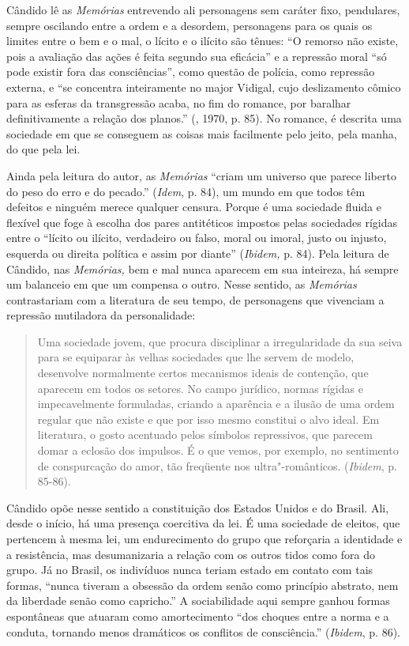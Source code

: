 Cândido lê as \emph{Memórias} entrevendo ali personagens sem caráter
fixo, pendulares, sempre oscilando entre a ordem e a desordem,
personagens para os quais os limites entre o bem e o mal, o lícito e o
ilícito são tênues: ``O remorso não existe, pois a avaliação das ações é
feita segundo sua eficácia'' e a repressão moral ``só pode existir fora
das consciências'', como questão de polícia, como repressão externa, e
``se concentra inteiramente no major Vidigal, cujo deslizamento cômico
para as esferas da transgressão acaba, no fim do romance, por baralhar
definitivamente a relação dos planos.'' (, 1970, p. 85). No
romance, é descrita uma sociedade em que se conseguem as coisas mais
facilmente pelo jeito, pela manha, do que pela lei.

Ainda pela leitura do autor, as \emph{Memórias} ``criam um universo que
parece liberto do peso do erro e do pecado.'' (\emph{Idem}, p. 84), um
mundo em que todos têm defeitos e ninguém merece qualquer censura.
Porque é uma sociedade fluida e flexível que foge à escolha dos pares
antitéticos impostos pelas sociedades rígidas entre o ``lícito ou
ilícito, verdadeiro ou falso, moral ou imoral, justo ou injusto,
esquerda ou direita política e assim por diante'' (\emph{Ibidem,} p.
84). Pela leitura de Cândido, nas \emph{Memórias,} bem e mal nunca
aparecem em sua inteireza, há sempre um balanceio em que um compensa o
outro. Nesse sentido, as \emph{Memórias} contrastariam com a literatura
de seu tempo, de personagens que vivenciam a repressão mutiladora da
personalidade:

\begin{quote}
Uma sociedade jovem, que procura disciplinar a irregularidade da sua
seiva para se equiparar às velhas sociedades que lhe servem de modelo,
desenvolve normalmente certos mecanismos ideais de contenção, que
aparecem em todos os setores. No campo jurídico, normas rígidas e
impecavelmente formuladas, criando a aparência e a ilusão de uma ordem
regular que não existe e que por isso mesmo constitui o alvo ideal. Em
literatura, o gosto acentuado pelos símbolos repressivos, que parecem
domar a eclosão dos impulsos. É o que vemos, por exemplo, no sentimento
de conspurcação do amor, tão freqüente nos ultra"-românticos.
(\emph{Ibidem}, p. 85-86).
\end{quote}

Cândido opõe nesse sentido a constituição dos Estados Unidos e do
Brasil. Ali, desde o início, há uma presença coercitiva da lei. É uma
sociedade de eleitos, que pertencem à mesma lei, um endurecimento do
grupo que reforçaria a identidade e a resistência, mas desumanizaria a
relação com os outros tidos como fora do grupo. Já no Brasil, os
indivíduos nunca teriam estado em contato com tais formas, ``nunca
tiveram a obsessão da ordem senão como princípio abstrato, nem da
liberdade senão como capricho.'' A sociabilidade aqui sempre ganhou
formas espontâneas que atuaram como amortecimento ``dos choques entre a
norma e a conduta, tornando menos dramáticos os conflitos de
consciência.'' (\emph{Ibidem}, p. 86).

